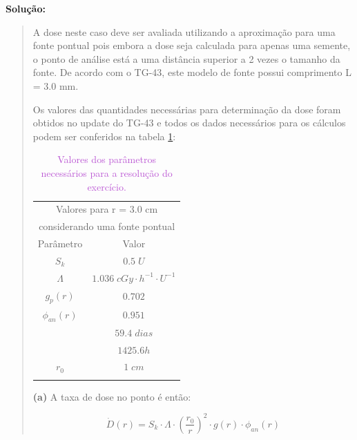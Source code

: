 \documentclass[11pt,a4paper]{article}
\begin{document}
			\textbf{\textcolor{CarnationPink}{Solução:}}

			\begin{quote}
				\color{MediumOrchid}
				A dose neste caso deve ser avaliada utilizando a aproximação para uma fonte pontual pois embora a dose seja calculada para apenas uma semente, o ponto de análise está a uma distância superior a 2 vezes o tamanho da fonte. De acordo com o TG-43, este modelo de fonte possui comprimento L = 3.0 mm.

				Os valores das quantidades necessárias para determinação da dose foram obtidos no update do TG-43 e todos os dados necessários para os cálculos podem ser conferidos na tabela \ref{tb:paramExercCalcDose}:

				\begin{table}[h]
					\color{MediumOrchid}
					\centering
					\caption{\textcolor{MediumOrchid}{Valores dos parâmetros necessários para a resolução do exercício.}}
					\label{tb:paramExercCalcDose}
					\begin{tabular}{c c}
					\hline
					\multicolumn{2}{c}{Valores para r = 3.0 cm } \\
					\multicolumn{2}{c}{considerando uma fonte pontual} \\
					\midrule[1.5pt]
					Parâmetro & Valor \\
					\addlinespace[4pt]
					\midrule[1.5pt]
					$S_k$ & $0.5 \; U$ \\
					\addlinespace[4pt]
					\hline
					$\varLambda$ & $1.036 \; cGy  \cdot h^{-1} \cdot U^{-1}$ \\
					\addlinespace[4pt]
					\hline
					$g_p(r)$ & $0.702$ \\
					\addlinespace[4pt]
					\hline
					$\phi_{an}(r)$ & $0.951$ \\
					\addlinespace[4pt]
					\hline
					\multirow{2}{*}{$t_{1/2}$} & $59.4 \; dias$\\
					 & $1425.6 h$ \\
					\addlinespace[4pt]
					\hline
					 $r_0$ & $ 1 \; cm$ \\
					\addlinespace[4pt]
					\hline
					\hline
					
					\end{tabular}
				\end{table}

				\textbf{(a)} A taxa de dose  no ponto é então:

					$$\dot{D}(r) = S_k \cdot \varLambda \cdot \left(\frac{r_0}{r}\right)^2 \cdot g(r) \cdot \phi_{an}(r)$$
				

\end{quote}
\end{document}

